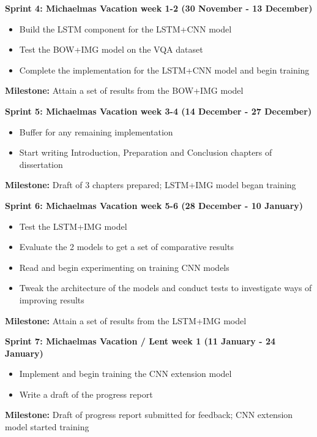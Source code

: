 \documentclass[12pt,a4paper,twoside]{article}
\begin{document}
\noindent\textbf{Sprint 4: Michaelmas Vacation week 1-2 (30 November - 13 December)}
\begin{addmargin}[3em]{0em}
	\begin{itemize}
		\setlength\itemsep{0em}
		\item Build the LSTM component for the LSTM+CNN model
		\item Test the BOW+IMG model on the VQA dataset
		\item Complete the implementation for the LSTM+CNN model and begin training
	\end{itemize}
	\noindent\textbf{Milestone:} Attain a set of results from the BOW+IMG model
	\setlength{\parskip}{1em}
\end{addmargin}

\noindent\textbf{Sprint 5: Michaelmas Vacation week 3-4 (14 December - 27 December)}
\begin{addmargin}[3em]{0em}
	\begin{itemize}
		\setlength\itemsep{0em}
		\item Buffer for any remaining implementation
		\item Start writing Introduction, Preparation and Conclusion chapters of dissertation
	\end{itemize}
	\noindent\textbf{Milestone:} Draft of 3 chapters prepared; LSTM+IMG model began training
	\setlength{\parskip}{1em}
\end{addmargin}

\noindent\textbf{Sprint 6: Michaelmas Vacation week 5-6 (28 December  - 10 January)}
\begin{addmargin}[3em]{0em}
	\begin{itemize}
		\setlength\itemsep{0em}
		\item Test the LSTM+IMG model
		\item Evaluate the 2 models to get a set of comparative results
		\item Read and begin experimenting on training CNN models
		\item Tweak the architecture of the models and conduct tests to investigate ways of improving results
	\end{itemize}
	\noindent\textbf{Milestone:} Attain a set of results from the LSTM+IMG model
	\setlength{\parskip}{1em}
\end{addmargin}
\newpage
\noindent\textbf{Sprint 7: Michaelmas Vacation / Lent week 1 (11 January - 24 January)}
\begin{addmargin}[3em]{0em}
	\begin{itemize}
		\setlength\itemsep{0em}
		\item Implement and begin training the CNN extension model
		\item Write a draft of the progress report
	\end{itemize}
	\noindent\textbf{Milestone:} Draft of progress report submitted for feedback; CNN extension model started training 
	\setlength{\parskip}{1em}
\end{addmargin}
\end{document}
